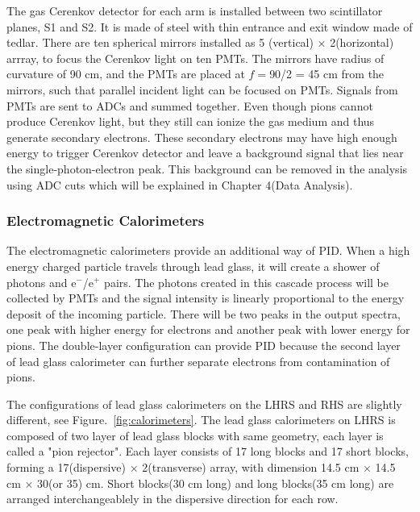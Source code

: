 The gas Cerenkov detector for each arm is installed between two scintillator planes, S1 and S2.
It is made of steel with thin entrance and exit window made of tedlar.
There are ten spherical mirrors installed as 5 (vertical) $\times$ 2(horizontal) arrray,
to focus the Cerenkov light on ten PMTs.
The mirrors have radius of curvature of 90 cm, and the PMTs are placed at $f=$90/2 = 45 cm from the mirrors,
such that parallel incident light can be focused on PMTs.
Signals from PMTs are sent to ADCs and summed together.
Even though pions cannot produce Cerenkov light, but they still can ionize the gas medium 
and thus generate secondary electrons. These secondary electrons may have high enough energy to trigger
Cerenkov detector and leave a background signal that lies near the single-photon-electron peak.
This background can be removed in the analysis using ADC cuts which will be explained in Chapter 4(Data Analysis).


\subsubsection{Electromagnetic Calorimeters}
The electromagnetic calorimeters provide an additional way of PID. When a high energy charged particle travels through 
lead glass, it will create a shower of photons and e$^-$/e$^+$ pairs. The photons created in this cascade process
will be collected by PMTs and the signal intensity is linearly proportional to the energy deposit of the incoming particle.
There will be two peaks in the output spectra, one peak with higher energy for electrons and another peak with lower energy
for pions. The double-layer configuration can provide PID because the second layer of lead glass calorimeter can further
separate electrons from contamination of pions.

The configurations of lead glass calorimeters on the LHRS and RHS are slightly different, see
Figure.~\ref{fig:calorimeters}.
The lead glass calorimeters on LHRS is composed of two layer of lead glass blocks with same geometry, each layer is called
a "pion rejector". Each layer consists of 17 long blocks and 17 short blocks, forming a 17(dispersive) $\times$
2(transverse) array, with dimension 14.5 cm $\times$ 14.5 cm $\times$ 30(or 35) cm.
Short blocks(30 cm long) and long blocks(35 cm long) are arranged interchangeablely in the dispersive direction for each row.

